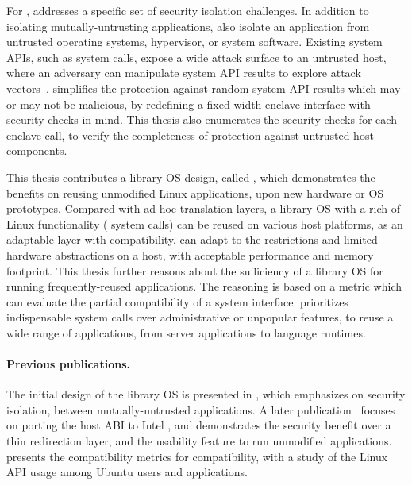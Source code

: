 For \sgx{}, \graphene{} addresses a specific set of security isolation challenges.
In addition to isolating mutually-untrusting applications,
\graphene{} also isolate an \sgx{} application
from untrusted operating systems, hypervisor, or system software.
Existing system APIs, such as system calls, expose a wide attack surface
to an untrusted host, where an adversary
can manipulate system API results to explore attack vectors~\cite{checkoway13iago}.
\graphene{} simplifies
the protection against random system API results which may or may not be malicious,
by redefining a fixed-width enclave interface
with security checks in mind.
This thesis also enumerates the security checks for each enclave call,
to verify the completeness
of protection against untrusted host components.










This thesis contributes a library OS design, called \graphene{},
which demonstrates the benefits on reusing unmodified Linux applications, upon new hardware or OS prototypes.
Compared with ad-hoc translation layers,
a library OS with a rich of Linux functionality (\graphenesyscallnum{} system calls) can be reused on various host platforms, as an adaptable layer with compatibility.
\graphene{} can adapt to the restrictions and
limited hardware abstractions on a host, with acceptable performance and memory footprint.
This thesis further reasons about the sufficiency of a library OS
for running frequently-reused applications. The reasoning is based on a metric which can evaluate the partial compatibility of a system interface.
\graphene{} prioritizes indispensable system calls over administrative or unpopular features,
to reuse a wide range of applications, from server applications to language runtimes.


\paragraph{Previous publications.}
The initial design of the \graphene{} library OS is presented in \cite{tsai14graphene}, which emphasizes on security isolation, between mutually-untrusted applications.
A later publication~\cite{tsai17graphene-sgx} focuses on porting the host ABI
to Intel \sgx{}, and demonstrates the security benefit 
over a thin redirection layer, and the usability feature to run unmodified applications.
\cite{tsai16apistudy} presents the compatibility metrics for compatibility,
with a study of the Linux API usage among Ubuntu users and applications.


